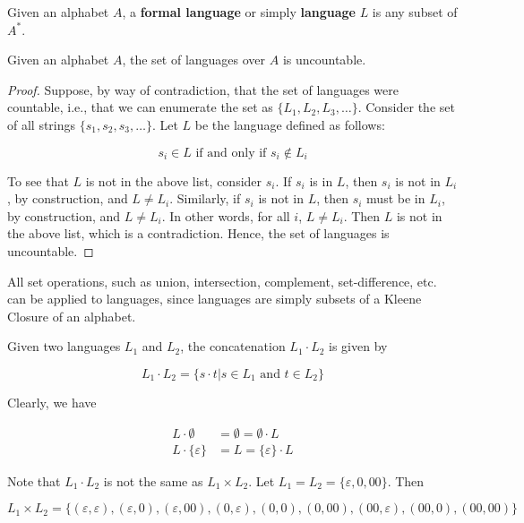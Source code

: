\begin{definition}
 Given an alphabet $A$, a \textbf{formal language} or simply \textbf{language} $L$ is any subset of $A^*$. 
\end{definition}

\begin{theorem}
 Given an alphabet $A$, the set of languages over $A$ is uncountable. 
\end{theorem}

\begin{proof}
 Suppose, by way of contradiction, that the set of languages were countable, i.e., that we can enumerate the set as $\{L_1, L_2, L_3, \hdots\}$. Consider the set of all strings $\{s_1, s_2, s_3, \hdots\}$. Let $L$ be the language defined as follows: 
 
\[s_i\in L\text{ if and only if } s_i\not\in L_i\]

 To see that $L$ is not in the above list, consider $s_i$. If $s_i$ is in $L$, then $s_i$ is not in $L_i$, by construction, and $L\neq L_i$. Similarly, if $s_i$ is not in $L$, then $s_i$ must be in $L_i$, by construction, and $L\neq L_i$. In other words, for all $i$, $L\neq L_i$. Then $L$ is not in the above list, which is a contradiction. Hence, the set of languages is uncountable. 
\end{proof}

All set operations, such as union, intersection, complement, set-difference, etc. can be applied to languages, since languages are simply subsets of a Kleene Closure of an alphabet.

\begin{definition}
 Given two languages $L_1$ and $L_2$, the concatenation $L_1\cdot L_2$ is given by
 
 \[L_1\cdot L_2=\{s\cdot t|s\in L_1\text{ and } t\in L_2\}\]
\end{definition}

Clearly, we have 

\begin{align*}
    L\cdot\emptyset &= \emptyset = \emptyset\cdot L\\
    L\cdot\{\varepsilon\} &= L = \{\varepsilon\}\cdot L
\end{align*}

Note that $L_1\cdot L_2$ is not the same as $L_1\times L_2$. Let $L_1=L_2=\{\varepsilon, 0, 00\}$. Then

\[L_1\times L_2=\{(\varepsilon, \varepsilon), (\varepsilon, 0), (\varepsilon, 00), (0, \varepsilon), (0, 0), (0, 00), (00, \varepsilon), (00, 0), (00, 00)\}\]

